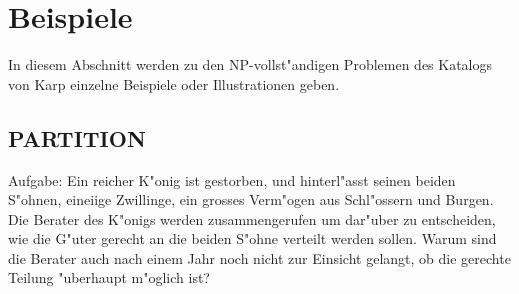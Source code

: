 \section{Beispiele}
In diesem Abschnitt werden zu den NP-vollst"andigen Problemen des
Katalogs von Karp einzelne Beispiele oder Illustrationen geben.
\subsection{PARTITION}
Aufgabe:
Ein reicher K"onig ist gestorben, und hinterl"asst seinen beiden
S"ohnen, eineiige Zwillinge, ein grosses Verm"ogen aus Schl"ossern
und Burgen. Die Berater des K"onigs werden zusammengerufen um
dar"uber zu entscheiden, wie die G"uter gerecht an die beiden S"ohne
verteilt werden sollen. Warum sind die Berater auch nach einem Jahr
noch nicht zur Einsicht gelangt, ob die gerechte Teilung "uberhaupt
m"oglich ist?

